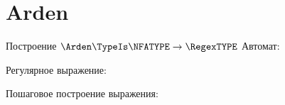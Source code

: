 \section{Arden}
\begin{frame}{Построение $\Arden\TypeIs\NFATYPE\to\RegexTYPE$}
	Автомат:


	Регулярное выражение:

	Пошаговое построение выражения:


\end{frame}
